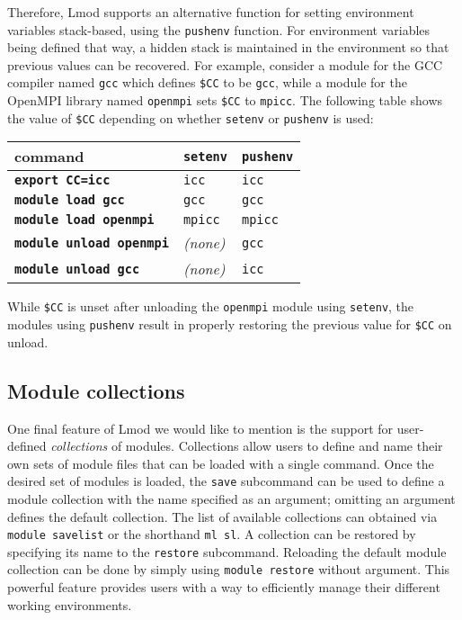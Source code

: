 Therefore, Lmod supports an alternative function for setting environment variables
stack-based, using the \texttt{\small pushenv} function. For environment
variables being defined that way, a hidden stack is maintained in the environment
so that previous values can be recovered.
For example, consider a module for the GCC compiler named \texttt{\small gcc} which
defines \texttt{\small \$CC} to be \texttt{\small gcc}, while a module for the
OpenMPI library named \texttt{\small openmpi} sets \texttt{\small \$CC} to
\texttt{\small mpicc}. The following table shows the value of \texttt{\small \$CC}
depending on whether \texttt{\small setenv} or \texttt{\small pushenv} is used:
\begin{center}
 \begin{tabular}{l|l|l}
 command                                 & \texttt{\small setenv} & \texttt{\small pushenv}\\
 \hline
 \textbf{\texttt{\small export CC=icc}}  & \texttt{\small icc}  & \texttt{\small icc} \\
 \textbf{\texttt{\small module load   gcc}}   & \texttt{\small gcc}    & \texttt{\small gcc}  \\
 \textbf{\texttt{\small module load   openmpi}} & \texttt{\small mpicc}  & \texttt{\small mpicc} \\
 \textbf{\texttt{\small module unload openmpi}} & \emph{(none)}   & \texttt{\small gcc}  \\
 \textbf{\texttt{\small module unload gcc}}   & \emph{(none)}   & \texttt{\small icc} \\
  \hline
    \end{tabular}
\end{center}
\noindent
While \texttt{\small\$CC} is unset after unloading the \texttt{\small openmpi} module
using \texttt{\small setenv}, the modules using \texttt{\small pushenv} result
in properly restoring the previous value for \texttt{\small\$CC} on unload.


\subsection{Module collections}

One final feature of Lmod we would like to mention is the support for user-defined
\emph{collections} of modules. Collections allow users to define and name their
own sets of module files that can be loaded with a single command. Once the desired
set of modules is loaded, the \texttt{\small save} subcommand can be used
to define a module collection with the name specified as an argument; omitting an
argument defines the default collection. The list of available collections
can obtained via \texttt{\small module savelist} or the shorthand
\texttt{\small ml sl}. A collection can be restored by specifying its name to the
\texttt{\small restore} subcommand. Reloading the default module collection can be
done by simply using \texttt{\small module restore} without argument.
This powerful feature provides users with a way to efficiently manage their
different working environments.

